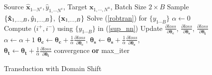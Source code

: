 
\begin{figure}
    \begin{minipage}{0.5\textwidth}
    \vspace{-4mm}
\begin{algorithm}[H]
   \caption{Transduction with Domain Shift}
   \label{alg:example}
  \small
\begin{algorithmic}
    Source $\mathbf{\hat{x}}_{1 \cdots N^s},\hat{y}_{1, \cdots N^s}$, Target $\mathbf{x}_{1,\cdots,N^u}$, Batch Size $2\times B$
   \REPEAT
   \STATE  Sample $\{\mathbf{\hat{x}}_{1,\ldots,B},\hat{y}_{1,\ldots,B} \}$, $\{\mathbf{x}_{1,\ldots,B}\}$
   \STATE Solve (\ref{robtran}) for $\{y_{1 \cdots B}\}$
   \STATE $\alpha \leftarrow 0$
   \STATE Compute ($i^+, i^-$) using $\{y_{1 \cdots B}\}$ in (\ref{sup_nn})
   \STATE Update $\frac{\partial loss}{\partial \mathbf{\theta_c}}$,  $\frac{\partial loss}{\partial \mathbf{\theta_s}}$, $\frac{\partial loss}{\partial \mathbf{\theta_t}}$
   \STATE $\alpha \leftarrow \alpha + 1$
   \ENDIF
   \ENDFOR
   \STATE $\mathbf{\theta_c} \leftarrow \mathbf{\theta_c} + \frac{1}{\alpha} \frac{\partial loss}{\partial \mathbf{\theta_c}}$, $\mathbf{\theta_s} \leftarrow \mathbf{\theta_s} + \frac{1}{\alpha} \frac{\partial loss}{\partial \mathbf{\theta_s}}$, \\ $\mathbf{\theta_t} \leftarrow \mathbf{\theta_t} + \frac{1}{\alpha} \frac{\partial loss}{\partial \mathbf{\theta_t}}$
   \ENDIF
   \UNTIL convergence \textbf{or} max\_iter
\end{algorithmic}
\end{algorithm}
\vspace{-18mm}
  \end{minipage}
  \end{figure}

